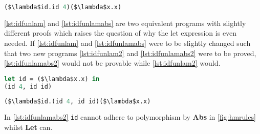 \documentclass[11pt,oneside,a4paper]{report}
\begin{document}
\begin{exmp}
\begin{lstlisting}[language=ML,caption={Identity function in lambda calculus by abstraction},label={lst:idfunlamabs},mathescape=true]
($\lambda$id.id 4)($\lambda$x.x)
\end{lstlisting}
\autoref{lst:idfunlam} and \autoref{lst:idfunlamabs} are two equivalent programs with slightly different proofs which raises the question of why the let expression is even needed.
If \autoref{lst:idfunlam} and \autoref{lst:idfunlamabs} were to be slightly changed such that two new programs \autoref{lst:idfunlam2} and \autoref{lst:idfunlamabs2} were to be proved, \autoref{lst:idfunlamabs2} would not be provable while \autoref{lst:idfunlam2} would.
\begin{lstlisting}[language=ML,caption={Identity function with two applications},label={lst:idfunlam2},mathescape=true]
let id = ($\lambda$x.x) in
(id 4, id id)
\end{lstlisting}
\begin{lstlisting}[language=ML,caption={Identity function with two applications as abstraction},label={lst:idfunlamabs2},mathescape=true]
($\lambda$id.(id 4, id id)($\lambda$x.x)
\end{lstlisting}
In \autoref{lst:idfunlamabs2} \texttt{id} cannot adhere to polymorphism by \textbf{Abs} in \autoref{fig:hmrules} whilst \textbf{Let} can.

\end{exmp}
\end{document}
